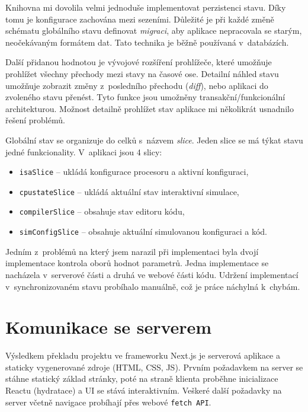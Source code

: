 Knihovna mi dovolila velmi jednoduše implementovat perzistenci stavu.
Díky tomu je konfigurace zachována mezi sezeními.
Důležité je při každé změně schématu globálního stavu definovat \emph{migraci}, aby aplikace nepracovala se starým, neočekávaným formátem dat.
Tato technika je běžně používaná v~databázích.

Další přidanou hodnotou je vývojové rozšíření prohlížeče, které umožňuje prohlížet všechny přechody mezi stavy na časové ose.
Detailní náhled stavu umožňuje zobrazit změny z~posledního přechodu (\emph{diff}), nebo aplikaci do zvoleného stavu přenést.
Tyto funkce jsou umožněny transakční/funkcionální architekturou.
Možnost detailně prohlížet stav aplikace mi několikrát usnadnilo řešení problémů.

Globální stav se organizuje do celků s~názvem \emph{slice}.
Jeden slice se má týkat stavu jedné funkcionality.
V~aplikaci jsou 4 slicy:
\begin{itemize}
    \item \texttt{isaSlice} -- ukládá konfigurace procesoru a aktivní konfiguraci,
    \item \texttt{cpustateSlice} -- ukládá aktuální stav interaktivní simulace,
    \item \texttt{compilerSlice} -- obsahuje stav editoru kódu,
    \item \texttt{simConfigSlice} -- obsahuje aktuální simulovanou konfiguraci a kód.
\end{itemize}

Jedním z~problémů na který jsem narazil při implementaci byla dvojí implementace kontrola oborů hodnot parametrů.
Jedna implementace se nacházela v~serverové části a druhá ve webové části kódu.
Udržení implementací v~synchronizovaném stavu probíhalo manuálně, což je práce náchylná k~chybám.

\section{Komunikace se serverem}

Výsledkem překladu projektu ve frameworku Next.js je serverová aplikace a staticky vygenerované zdroje (HTML, CSS, JS).
Prvním požadavkem na server se stáhne statický základ stránky, poté na straně klienta proběhne inicializace Reactu (hydratace) a UI se stává interaktivním.
Veškeré další požadavky na server včetně navigace probíhají přes webové \texttt{fetch API}.

